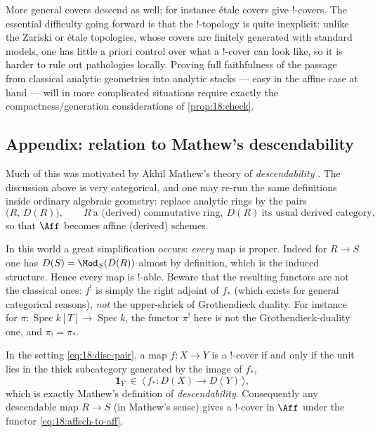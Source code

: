 \begin{remark}
\label{rmk:18:inexplicit}
More general covers descend as well; for instance \'etale covers give $!$-covers.
The essential difficulty going forward is that the $!$-topology is quite
inexplicit: unlike the Zariski or \'etale topologies, whose covers are finitely
generated with standard models, one has little a priori control over what a
$!$-cover can look like, so it is harder to rule out pathologies locally. Proving
full faithfulness of the passage from classical analytic geometries into analytic
stacks --- easy in the affine case at hand --- will in more complicated situations
require exactly the compactness/generation considerations of
\cref{prop:18:check}.
\end{remark}

\subsection{Appendix: relation to Mathew's descendability}
\label{subsec:18:descendability}

Much of this was motivated by Akhil Mathew's theory of \emph{descendability}
\cite{mathew2016galoisgroupstablehomotopy}. The discussion above is very
categorical, and one may re-run the same definitions inside ordinary algebraic
geometry: replace analytic rings by the pairs
\begin{equation}
\label{eq:18:disc-pair}
\bigl(R,\,D(R)\bigr),\qquad R\ \text{a (derived) commutative ring},\ D(R)\ \text{its usual derived category},
\end{equation}
so that $\Aff$ becomes affine (derived) schemes.

\begin{remark}
\label{rmk:18:everything-proper}
In this world a great simplification occurs: \emph{every} map is proper. Indeed for
$R\to S$ one has $D(S)=\Mod_S(D(R))$ almost by definition, which is the induced
structure. Hence every map is $!$-able. Beware that the resulting functors are not
the classical ones: $f^!$ is simply the right adjoint of $f_*$ (which exists for
general categorical reasons), \emph{not} the upper-shriek of Grothendieck duality.
For instance for $\pi\colon\operatorname{Spec}k[T]\to\operatorname{Spec}k$, the
functor $\pi^!$ here is not the Grothendieck-duality one, and $\pi_!=\pi_*$.
\end{remark}

\begin{proposition}[$!$-covers $=$ descendable maps]
\label{prop:18:descendable}
In the setting \eqref{eq:18:disc-pair}, a map $f\colon X\to Y$ is a $!$-cover if and
only if the unit lies in the thick subcategory generated by the image of $f_*$,
\begin{equation}
\label{eq:18:descendable}
\mathbf 1_Y\ \in\ \bigl\langle\, f_*\colon D(X)\to D(Y)\,\bigr\rangle,
\end{equation}
which is exactly Mathew's definition of \emph{descendability}. Consequently any
descendable map $R\to S$ (in Mathew's sense) gives a $!$-cover in $\Aff$ under the
functor \eqref{eq:18:affsch-to-aff}.
\end{proposition}

